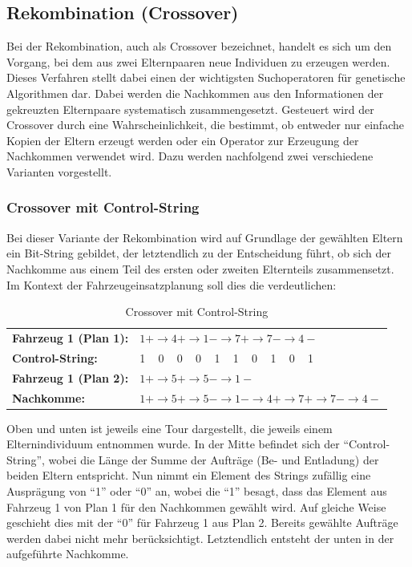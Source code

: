 \subsection{Rekombination (Crossover)}
Bei der Rekombination, auch als Crossover bezeichnet, handelt es sich um den Vorgang, bei dem aus zwei Elternpaaren neue Individuen zu erzeugen werden. Dieses Verfahren stellt dabei einen der wichtigsten Suchoperatoren für genetische Algorithmen dar. Dabei werden die Nachkommen aus den Informationen der gekreuzten Elternpaare systematisch zusammengesetzt. Gesteuert wird der Crossover durch eine Wahrscheinlichkeit, die bestimmt, ob entweder nur einfache Kopien der Eltern erzeugt werden oder ein Operator zur Erzeugung der Nachkommen verwendet wird. Dazu werden nachfolgend zwei verschiedene Varianten vorgestellt.

\subsubsection{Crossover mit Control-String}
\label{sec:CrossoverControlString}
Bei dieser Variante der Rekombination wird auf Grundlage der gewählten Eltern ein Bit-String gebildet, der letztendlich zu der Entscheidung führt, ob sich der Nachkomme aus einem Teil des ersten oder zweiten Elternteils zusammensetzt. Im Kontext der Fahrzeugeinsatzplanung soll dies die  verdeutlichen:

\begin{table}[ht!]
 \centering
 \caption{Crossover mit Control-String}
 \begin{tabular}{ll}
  \textbf{Fahrzeug 1 (Plan 1):}	& $1+ \rightarrow 4+ \rightarrow 1- \rightarrow 7+ \rightarrow 7- \rightarrow 4-$ \\
  \textbf{Control-String:} 	& 1 ~ 0 ~ 0 ~ 0 ~ 1 ~ 1 ~ 0 ~ 1 ~ 0 ~ 1 \\
  \textbf{Fahrzeug 1 (Plan 2):} 	& $1+ \rightarrow 5+ \rightarrow 5- \rightarrow 1-$ \\
  \textbf{Nachkomme:} 		& $1+ \rightarrow 5+ \rightarrow 5- \rightarrow 1- \rightarrow 4+ \rightarrow 7+ \rightarrow 7- \rightarrow 4-$
 \end{tabular}
 \label{tab:CrossoverControlString}
\end{table}

Oben und unten ist jeweils eine Tour dargestellt, die jeweils einem Elternindividuum entnommen wurde. In der Mitte befindet sich der "`Control-String"', wobei die Länge der Summe der Aufträge (Be- und Entladung) der beiden Eltern entspricht. Nun nimmt ein Element des Strings zufällig eine Ausprägung von "`1"' oder "`0"' an, wobei die "`1"' besagt, dass das Element aus Fahrzeug 1 von Plan 1 für den Nachkommen gewählt wird. Auf gleiche Weise geschieht dies mit der "`0"' für Fahrzeug 1 aus Plan 2. Bereits gewählte Aufträge werden dabei nicht mehr berücksichtigt. Letztendlich entsteht der unten in der  aufgeführte Nachkomme.

